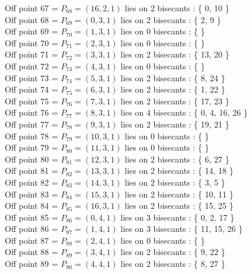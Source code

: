 \documentclass{article}
\begin{document}
{Off point 67 = $P_{68} = ( 16, 2, 1 )$ lies on 2 bisecants : \{ 0, 10 \}\\
Off point 68 = $P_{69} = ( 0, 3, 1 )$ lies on 2 bisecants : \{ 2, 9 \}\\
Off point 69 = $P_{70} = ( 1, 3, 1 )$ lies on 0 bisecants : \{  \}\\
Off point 70 = $P_{71} = ( 2, 3, 1 )$ lies on 0 bisecants : \{  \}\\
Off point 71 = $P_{72} = ( 3, 3, 1 )$ lies on 2 bisecants : \{ 13, 20 \}\\
Off point 72 = $P_{73} = ( 4, 3, 1 )$ lies on 0 bisecants : \{  \}\\
Off point 73 = $P_{74} = ( 5, 3, 1 )$ lies on 2 bisecants : \{ 8, 24 \}\\
Off point 74 = $P_{75} = ( 6, 3, 1 )$ lies on 2 bisecants : \{ 1, 22 \}\\
Off point 75 = $P_{76} = ( 7, 3, 1 )$ lies on 2 bisecants : \{ 17, 23 \}\\
Off point 76 = $P_{77} = ( 8, 3, 1 )$ lies on 4 bisecants : \{ 0, 4, 16, 26 \}\\
Off point 77 = $P_{78} = ( 9, 3, 1 )$ lies on 2 bisecants : \{ 19, 21 \}\\
Off point 78 = $P_{79} = ( 10, 3, 1 )$ lies on 0 bisecants : \{  \}\\
Off point 79 = $P_{80} = ( 11, 3, 1 )$ lies on 0 bisecants : \{  \}\\
Off point 80 = $P_{81} = ( 12, 3, 1 )$ lies on 2 bisecants : \{ 6, 27 \}\\
Off point 81 = $P_{82} = ( 13, 3, 1 )$ lies on 2 bisecants : \{ 14, 18 \}\\
Off point 82 = $P_{83} = ( 14, 3, 1 )$ lies on 2 bisecants : \{ 3, 5 \}\\
Off point 83 = $P_{84} = ( 15, 3, 1 )$ lies on 2 bisecants : \{ 10, 11 \}\\
Off point 84 = $P_{85} = ( 16, 3, 1 )$ lies on 2 bisecants : \{ 15, 25 \}\\
Off point 85 = $P_{86} = ( 0, 4, 1 )$ lies on 3 bisecants : \{ 0, 2, 17 \}\\
Off point 86 = $P_{87} = ( 1, 4, 1 )$ lies on 3 bisecants : \{ 11, 15, 26 \}\\
Off point 87 = $P_{88} = ( 2, 4, 1 )$ lies on 0 bisecants : \{  \}\\
Off point 88 = $P_{89} = ( 3, 4, 1 )$ lies on 2 bisecants : \{ 9, 22 \}\\
Off point 89 = $P_{90} = ( 4, 4, 1 )$ lies on 2 bisecants : \{ 8, 27 \}\\
}
\end{document}
